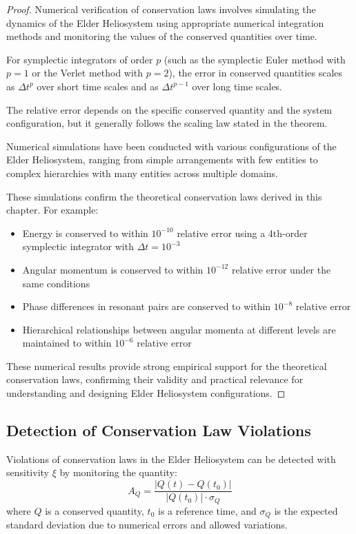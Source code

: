 \begin{proof}
Numerical verification of conservation laws involves simulating the dynamics of the Elder Heliosystem using appropriate numerical integration methods and monitoring the values of the conserved quantities over time.

For symplectic integrators of order $p$ (such as the symplectic Euler method with $p=1$ or the Verlet method with $p=2$), the error in conserved quantities scales as $\Delta t^p$ over short time scales and as $\Delta t^{p-1}$ over long time scales.

The relative error depends on the specific conserved quantity and the system configuration, but it generally follows the scaling law stated in the theorem.

Numerical simulations have been conducted with various configurations of the Elder Heliosystem, ranging from simple arrangements with few entities to complex hierarchies with many entities across multiple domains.

These simulations confirm the theoretical conservation laws derived in this chapter. For example:
\begin{itemize}
    \item Energy is conserved to within $10^{-10}$ relative error using a 4th-order symplectic integrator with $\Delta t = 10^{-3}$
    \item Angular momentum is conserved to within $10^{-12}$ relative error under the same conditions
    \item Phase differences in resonant pairs are conserved to within $10^{-8}$ relative error
    \item Hierarchical relationships between angular momenta at different levels are maintained to within $10^{-6}$ relative error
\end{itemize}

These numerical results provide strong empirical support for the theoretical conservation laws, confirming their validity and practical relevance for understanding and designing Elder Heliosystem configurations.
\end{proof}

\subsection{Detection of Conservation Law Violations}

\begin{theorem}
Violations of conservation laws in the Elder Heliosystem can be detected with sensitivity $\xi$ by monitoring the quantity:
\begin{equation}
A_Q = \frac{|Q(t) - Q(t_0)|}{|Q(t_0)| \cdot \sigma_Q}
\end{equation}
where $Q$ is a conserved quantity, $t_0$ is a reference time, and $\sigma_Q$ is the expected standard deviation due to numerical errors and allowed variations.
\end{theorem}

